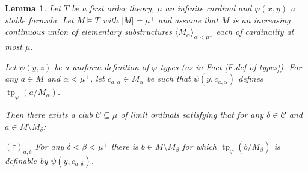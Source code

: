\documentclass[a4paper]{amsart}
\theoremstyle{plain}
\newtheorem{lemma}[theorem]{Lemma}
\theoremstyle{definition}
\theoremstyle{remark}
\numberwithin{equation}{section}
\DeclareMathOperator{\tp}{tp}
\begin{document}
\begin{lemma}\label{L:club of models}
Let $T$ be a first order theory, $\mu$ an infinite cardinal and $\varphi(x,y)$ a stable formula. Let $M\vDash T$ with $|M|=\mu^+$ and assume that $M$ is an increasing continuous union of elementary substructures $\langle M_\alpha\rangle_{\alpha<\mu^+}$ each of cardinality at most $\mu$.

Let $\psi(y,z)$ be a uniform definition of $\varphi$-types (as in Fact \ref{F:def of types}). For any $a\in M$ and $\alpha<\mu^+$, let $c_{a,\alpha}\in M_\alpha$ be such that $\psi(y,c_{a,\alpha})$ defines $\tp_\varphi(a/M_\alpha)$.

Then there exists a club $\mathcal{C}\subseteq \mu$ of limit ordinals satisfying that for any $\delta\in \mathcal{C}$ and $a\in M\setminus M_\delta$:

$(\dagger)_{a,\delta}$ For any $\delta<\beta<\mu^+$ there is $b\in M\setminus M_\beta$ for which $\tp_\varphi(b/M_\beta)$ is definable by $\psi(y,c_{a,\delta})$.
\end{lemma}
\end{document}
